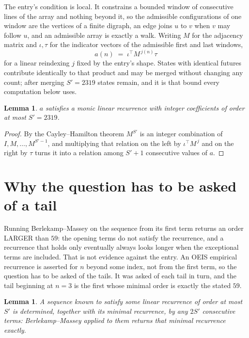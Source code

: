 \documentclass[11pt,a4paper]{article}
\theoremstyle{plain}
\newtheorem{lemma}[theorem]{Lemma}
\theoremstyle{definition}
\begin{document}
The entry's condition is local. It constrains a bounded window of consecutive lines of the
array and nothing beyond it, so the admissible configurations of one window are the vertices of
a finite digraph, an edge joins $u$ to $v$ when $v$ may follow $u$, and an admissible array is
exactly a walk. Writing $M$ for the adjacency matrix and $\iota,\tau$ for the indicator vectors
of the admissible first and last windows,
\[
a(n)\;=\;\iota^{\!\top}M^{\,j(n)}\tau
\]
for a linear reindexing $j$ fixed by the entry's shape. States with identical futures
contribute identically to that product and may be merged without changing any count; after
merging $S'=2319$ states remain, and it is that bound every computation below uses.

\begin{lemma}\label{lem:cf}
$a$ satisfies a monic linear recurrence with integer coefficients of order at most $S'=2319$.
\end{lemma}

\begin{proof}
By the Cayley--Hamilton theorem $M^{S'}$ is an integer combination of $I,M,\dots,M^{S'-1}$,
and multiplying that relation on the left by $\iota^{\!\top}M^{\,j}$ and on the right by
$\tau$ turns it into a relation among $S'+1$ consecutive values of $a$.
\end{proof}

\section{Why the question has to be asked of a tail}

Running Berlekamp--Massey on the sequence from its first term returns an order LARGER than $59$: the opening terms do not satisfy the recurrence, and a recurrence that holds only eventually always looks longer when the exceptional terms are included. That is not evidence against the entry. An OEIS empirical recurrence is asserted for $n$ beyond some index, not from the first term, so the question has to be asked of the tails. It was asked of each tail in turn, and the tail beginning at $n=3$ is the first whose minimal order is exactly the stated $59$.

\begin{lemma}\label{lem:bm}
A sequence known to satisfy some linear recurrence of order at most $S'$ is determined,
together with its minimal recurrence, by any $2S'$ consecutive terms: Berlekamp--Massey applied
to them returns that minimal recurrence exactly.
\end{lemma}
\end{document}
